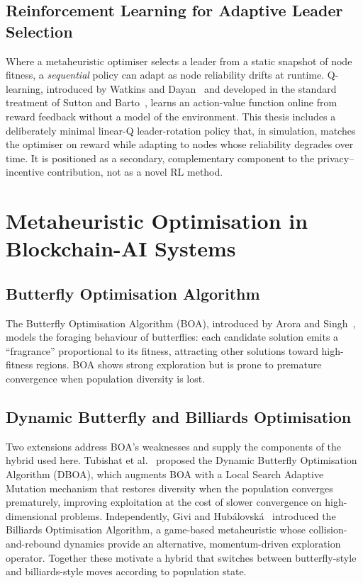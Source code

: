 \subsection{Reinforcement Learning for Adaptive Leader Selection}

Where a metaheuristic optimiser selects a leader from a static snapshot of node fitness, a \emph{sequential} policy can adapt as node reliability drifts at runtime. Q-learning, introduced by Watkins and Dayan~\cite{watkins1992} and developed in the standard treatment of Sutton and Barto~\cite{suttonbarto2018}, learns an action-value function online from reward feedback without a model of the environment. This thesis includes a deliberately minimal linear-Q leader-rotation policy that, in simulation, matches the optimiser on reward while adapting to nodes whose reliability degrades over time. It is positioned as a secondary, complementary component to the privacy--incentive contribution, not as a novel RL method.

\section{Metaheuristic Optimisation in Blockchain-AI Systems}

\subsection{Butterfly Optimisation Algorithm}

The Butterfly Optimisation Algorithm (BOA), introduced by Arora and Singh~\cite{arora2019}, models the foraging behaviour of butterflies: each candidate solution emits a ``fragrance'' proportional to its fitness, attracting other solutions toward high-fitness regions. BOA shows strong exploration but is prone to premature convergence when population diversity is lost.

\subsection{Dynamic Butterfly and Billiards Optimisation}

Two extensions address BOA's weaknesses and supply the components of the hybrid used here. Tubishat et al.~\cite{tubishat2020} proposed the Dynamic Butterfly Optimisation Algorithm (DBOA), which augments BOA with a Local Search Adaptive Mutation mechanism that restores diversity when the population converges prematurely, improving exploitation at the cost of slower convergence on high-dimensional problems. Independently, Givi and Hub\'alovsk\'a~\cite{givi2023} introduced the Billiards Optimisation Algorithm, a game-based metaheuristic whose collision-and-rebound dynamics provide an alternative, momentum-driven exploration operator. Together these motivate a hybrid that switches between butterfly-style and billiards-style moves according to population state.

